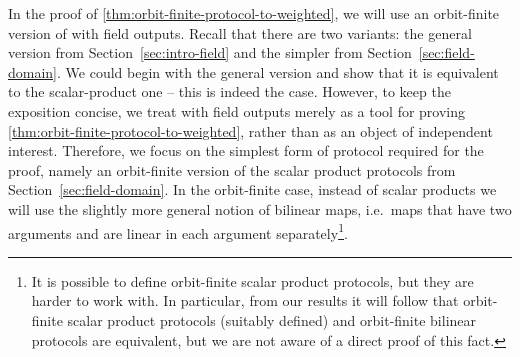 In the proof of \cref{thm:orbit-finite-protocol-to-weighted}, we will use an
orbit-finite version of  with field outputs. Recall that there
are two variants: the general version from Section~\ref{sec:intro-field} and
the simpler  from Section~\ref{sec:field-domain}.
We could begin with the general version and show that it is equivalent to the
scalar-product one -- this is indeed the case. However, to keep the exposition
concise, we treat  with field outputs merely as a tool
for proving \cref{thm:orbit-finite-protocol-to-weighted}, rather than as an
object of independent interest. Therefore, we focus on the simplest form of
protocol required for the proof, namely an orbit-finite version of the scalar
product protocols from Section~\ref{sec:field-domain}. In the orbit-finite
case, instead of scalar products we will use the slightly more general notion
of bilinear maps, i.e.~maps that have two arguments and are linear in each
argument separately\footnote{It is possible to define orbit-finite scalar
  product protocols, but they are harder to work with. In particular, from our
  results it will follow that orbit-finite scalar product protocols (suitably
  defined) and orbit-finite bilinear protocols are equivalent, but we are not
  aware of a direct proof of this fact.}. 


